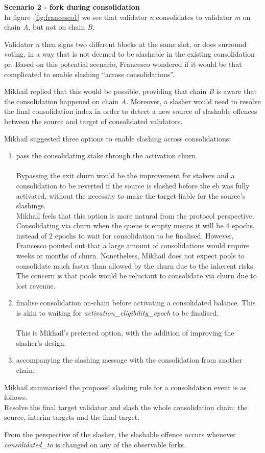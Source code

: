\noindent
\textbf{Scenario 2 - fork during consolidation} \\
In figure~\ref{fig:francesco1} we see that validator \textit{n} consolidates to validator \textit{m} on chain \textit{A}, but not on chain \textit{B}. 

Validator \textit{n} then signs two different blocks at the same slot, or does surround voting, in a way that is not deemed to be slashable in the existing consolidation \gls{pr}. Based on this potential scenario, Francesco wondered if it would be that complicated to enable slashing ``across consolidations''.

Mikhail replied that this would be possible, providing that chain \textit{B} is aware that the consolidation happened on chain \textit{A}. Moreover, a slasher would need to resolve the final consolidation index in order to detect a new source of slashable offences between the source and target of consolidated validators.

Mikhail suggested three options to enable slashing across consolidations:
\begin{enumerate}
\item pass the consolidating stake through the activation churn.\\
\\
Bypassing the exit churn would be the improvement for stakers and a consolidation to be reverted if the source is slashed before the \gls{eb} was fully activated, without the necessity to make the target liable for the source's slashings.\\
Mikhail feels that this option is more natural from the protocol perspective. Consolidating via churn when the queue is empty means it will be 4 epochs, instead of 2 epochs to wait for consolidation to be finalised. However, Francesco pointed out that a large amount of consolidations would require weeks or months of churn.  Nonetheless, Mikhail does not expect pools to consolidate much faster than allowed by the churn due to the inherent risks. The concern is that pools would be reluctant to consolidate via churn due to lost revenue. 

\item finalise consolidation on-chain before activating a consolidated balance. This is akin to waiting for \textit{activation\_eligibility\_epoch} to be finalised. \\
\\
This is Mikhail's preferred option, with the addition of improving the slasher's design.
\item accompanying the slashing message with the consolidation from another chain.
\end{enumerate}

Mikhail summarised the proposed slashing rule for a consolidation event is as follows: \\
\noindent
Resolve the final target validator and slash the whole consolidation chain: the source, interim targets and the final target.

From the perspective of the slasher, the slashable offence occurs whenever \textit{consolidated\_to} is changed on any of the observable forks. 


